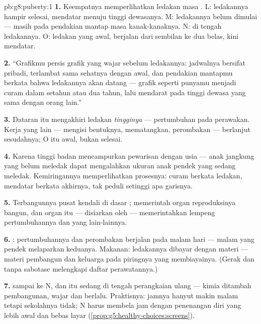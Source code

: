 \begin{solution}{pb:g8:puberty:1}
\textbf{1.} Keempatnya memperlihatkan ledakan masa .
L: ledakannya hampir selesai, mendatar menuju tinggi
dewasanya. M: ledakannya belum dimulai --- masih pada
pendakian mantap masa kanak-kanaknya. N: di tengah ledakannya.
O: ledakan yang awal, berjalan dari sembilan ke dua belas,
kini mendatar.

\textbf{2.} ``Grafikmu persis grafik yang wajar sebelum
ledakannya: jadwalnya bersifat pribadi, terlambat sama
sehatnya dengan awal, dan pendakian mantapmu berkata bahwa
ledakannya akan datang --- grafik seperti punyamu menjadi
curam dalam setahun atau dua tahun, lalu mendarat pada tinggi
dewasa yang sama dengan orang lain.''

\textbf{3.} Dataran itu mengakhiri ledakan \emph{tingginya}
--- pertumbuhan pada perawakan. Kerja  yang lain ---
mengisi bentuknya, mematangkan, perombakan  ---
berlanjut sesudahnya; O itu awal, bukan selesai.

\textbf{4.} Karena tinggi badan mencampurkan pewarisan dengan
usia --- anak jangkung yang belum meledak dapat mengalahkan
ukuran anak pendek yang sedang meledak. Kemiringannya
memperlihatkan prosesnya: curam berkata ledakan, mendatar
berkata akhirnya, tak peduli setinggi apa garisnya.

\textbf{5.} Terbangunnya pusat kendali di dasar ;
 memerintah organ reproduksinya bangun, dan 
organ itu --- disiarkan oleh  --- memerintahkan
lempeng pertumbuhannya dan yang lain-lainnya.

\textbf{6.} : pertumbuhannya dan perombakan 
berjalan pada malam hari --- malam yang pendek melaparkan
keduanya. Makanan: ledakannya dibayar dengan materi ---
materi pembangun dan keluarga pada piringnya yang
membiayainya. (Gerak dan tanpa sabotase melengkapi daftar
perawatannya.)

\textbf{7.}  sampai ke  N, dan  itu sedang
di tengah perangkaian ulang --- kimia ditambah pembangunan,
wajar dan berlalu. Praktisnya: jamnya hanyut makin malam
tetapi sekolahnya tidak; N harus membela jam  dengan
penenangan diri yang lebih awal dan bebas  layar
(\cref{prop:g5:healthy-choices:screens}).


\end{solution}
